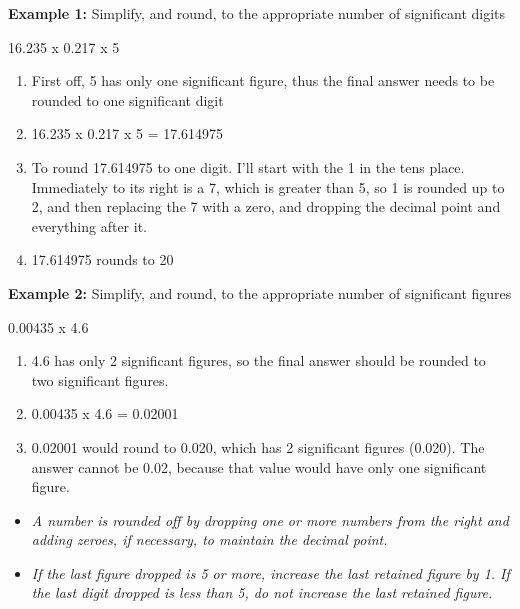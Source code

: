 \begin{itemize}
\begin{itemize}
\textbf{Example 1:}  Simplify, and round, to the appropriate number of significant digits \\
\begin{center}
16.235 x 0.217 x 5\\
\end{center}
\begin{enumerate}[Step 1.]
\item First off, 5 has only one significant figure, thus the final answer needs to be rounded to one significant digit\\
\item 16.235 x 0.217 x 5 = 17.614975\\
\item To round 17.614975 to one digit. I'll start with the 1 in the tens place. Immediately to its right is a 7, which is greater than 5, so 1 is rounded up to 2, and then replacing the 7 with a zero, and dropping the decimal point and everything after it.
\item 17.614975 rounds to 20\\
\end{enumerate}
\textbf{Example 2:}  Simplify, and round, to the appropriate number of significant figures\\
\begin{center}
0.00435 x 4.6
\end{center}
\begin{enumerate}[Step 1.]
\item 4.6 has only 2 significant figures, so the final answer should be rounded to two significant figures.
\item 0.00435 x 4.6 = 0.02001\\
\item 0.02001 would round to 0.020, which has 2 significant figures (0.020). The answer cannot be 0.02, because that value would have only one significant figure.\\
\end{enumerate}
\end{itemize}
\end{itemize}

\begin{itemize}
\item \emph{A number is rounded off by dropping one or more numbers from the right and adding zeroes, if necessary, to maintain the decimal point.} 
\item \emph{If the last figure dropped is 5 or more, increase the last retained figure by 1. If the last digit dropped is less than 5, do not increase the last retained figure.}
\end{itemize}


